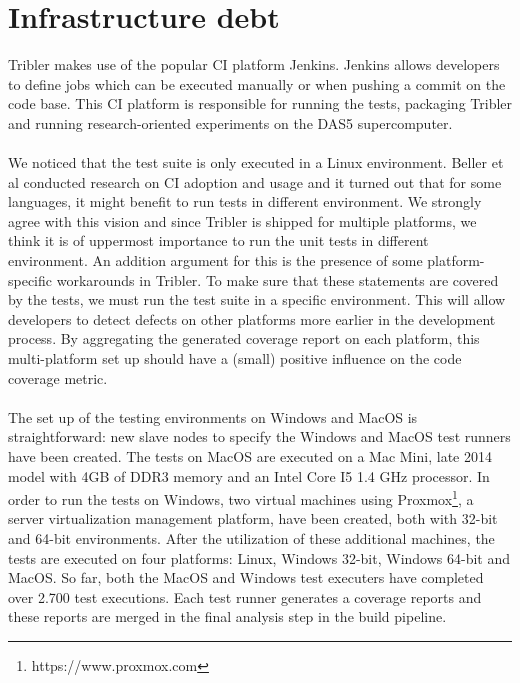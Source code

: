\section{Infrastructure debt}
Tribler makes use of the popular CI platform Jenkins. Jenkins allows developers to define jobs which can be executed manually or when pushing a commit on the code base. This CI platform is responsible for running the tests, packaging Tribler and running research-oriented experiments on the DAS5 supercomputer.\\\\
We noticed that the test suite is only executed in a Linux environment. Beller et al\cite{beller2016oops} conducted research on CI adoption and usage and it turned out that for some languages, it might benefit to run tests in different environment. We strongly agree with this vision and since Tribler is shipped for multiple platforms, we think it is of uppermost importance to run the unit tests in different environment. An addition argument for this is the presence of some platform-specific workarounds in Tribler. To make sure that these statements are covered by the tests, we must run the test suite in a specific environment. This will allow developers to detect defects on other platforms more earlier in the development process. By aggregating the generated coverage report on each platform, this multi-platform set up should have a (small) positive influence on the code coverage metric.\\\\
The set up of the testing environments on Windows and MacOS is straightforward: new slave nodes to specify the Windows and MacOS test runners have been created. The tests on MacOS are executed on a Mac Mini, late 2014 model with 4GB of DDR3 memory and an Intel Core I5 1.4 GHz processor. In order to run the tests on Windows, two virtual machines using Proxmox\footnote{https://www.proxmox.com}, a server virtualization management platform, have been created, both with 32-bit and 64-bit environments. After the utilization of these additional machines, the tests are executed on four platforms: Linux, Windows 32-bit, Windows 64-bit and MacOS. So far, both the MacOS and Windows test executers have completed over 2.700 test executions. Each test runner generates a coverage reports and these reports are merged in the final analysis step in the build pipeline.

